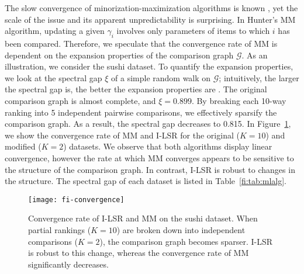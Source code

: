 The slow convergence of minorization-maximization algorithms is known \citep{hunter2004mm}, yet the scale of the issue and its apparent unpredictability is surprising.
In Hunter's MM algorithm, updating a given $\gamma_i$ involves only parameters of items to which $i$ has been compared.
Therefore, we speculate that the convergence rate of MM is dependent on the expansion properties of the comparison graph $\mathcal{G}$.
As an illustration, we consider the sushi dataset.
To quantify the expansion properties, we look at the spectral gap $\xi$ of a simple random walk on $\mathcal{G}$;
intuitively, the larger the spectral gap is, the better the expansion properties are \citep{levin2008markov}.
The original comparison graph is almost complete, and $\xi = 0.899$.
By breaking each \num{10}-way ranking into \num{5} independent pairwise comparisons, we effectively sparsify the comparison graph.
As a result, the spectral gap decreases to \num{0.815}.
In Figure~\ref{fi:fig:convergence}, we show the convergence rate of MM and I-LSR for the original ($K = 10$) and modified ($K = 2$) datasets.
We observe that both algorithms display linear convergence, however the rate at which MM converges appears to be sensitive to the structure of the comparison graph.
In contrast, I-LSR is robust to changes in the structure.
The spectral gap of each dataset is listed in Table~\ref{fi:tab:mlalg}.


\begin{figure}[ht]
\centering
\texttt{[image: fi-convergence]}
\caption{
Convergence rate of I-LSR and MM on the sushi dataset.
When partial rankings ($K = 10$) are broken down into independent comparisons ($K = 2$), the comparison graph becomes sparser.
I-LSR is robust to this change, whereas the convergence rate of MM significantly decreases.
}
\label{fi:fig:convergence}
\end{figure}

